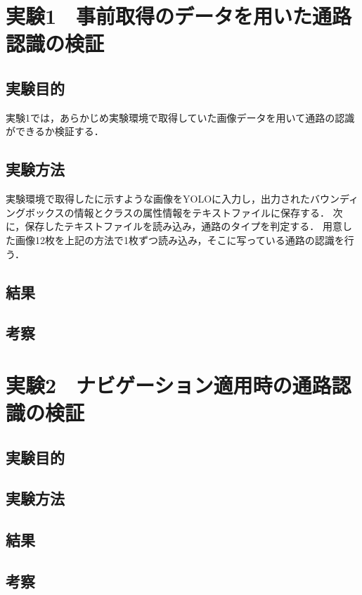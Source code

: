 \documentclass[../main]{subfiles}
\begin{document}
    \section{実験1　事前取得のデータを用いた通路認識の検証}
        \subsection{実験目的}
        実験1では，あらかじめ実験環境で取得していた画像データを用いて通路の認識ができるか検証する．
        \subsection{実験方法}
        実験環境で取得したに示すような画像をYOLOに入力し，出力されたバウンディングボックスの情報とクラスの属性情報をテキストファイルに保存する．
        次に，保存したテキストファイルを読み込み，通路のタイプを判定する．
        用意した画像12枚を上記の方法で1枚ずつ読み込み，そこに写っている通路の認識を行う．

        \subsection{結果}

        \subsection{考察}
    \section{実験2　ナビゲーション適用時の通路認識の検証}
        \subsection{実験目的}

        \subsection{実験方法}

        \subsection{結果}

        \subsection{考察}
\end{document}
